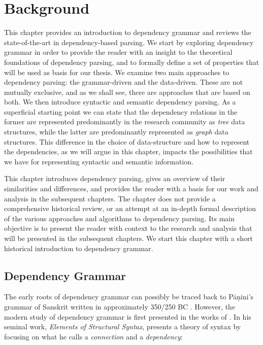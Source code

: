 \chapter{Background}
\label{chap:background}

This chapter provides an introduction to dependency grammar and reviews the state-of-the-art in dependency-based parsing. We start by exploring dependency grammar in order to provide the reader with an insight to the theoretical foundations of dependency parsing, and to formally define a set of properties that will be used as basis for our thesis. We examine two main approaches to dependency parsing: the grammar-driven and the data-driven. These are not mutually exclusive, and as we shall see, there are approaches that are based on both. We then introduce syntactic and semantic dependency parsing. As a superficial starting point we can state that the dependency relations in the former are represented predominantly in the research community as \textit{tree} data structures, while the latter are predominantly represented as \textit{graph} data structures. This difference in the choice of data-structure and how to represent the dependencies, as we will argue in this chapter, impacts the possibilities that we have for representing syntactic and semantic information.

This chapter introduces dependency parsing, gives an overview of their similarities and differences, and provides the reader with a basis for our work and analysis in the subsequent chapters. The chapter does not provide a comprehensive historical review, or an attempt at an in-depth formal description of the various approaches and algorithms to dependency parsing. Its main objective is to present the reader with context to the research and analysis that will be presented in the subsequent chapters. We start this chapter with a short historical introduction to dependency grammar.

\section{Dependency Grammar}
The early roots of dependency grammar can possibly be traced back to P\={a}\d{n}ini's grammar of Sanskrit written in approximately 350/250 BC \cite{Kruijff:02}. However, the modern study of  dependency grammar is first presented in the works of \citeauthor{Tes:15}. In his seminal work, \textit{Elements of Structural Syntax}, \citeauthor{Tes:15} presents a theory of syntax by focusing on what he calls a \textit{connection} and a \textit{dependency}:

